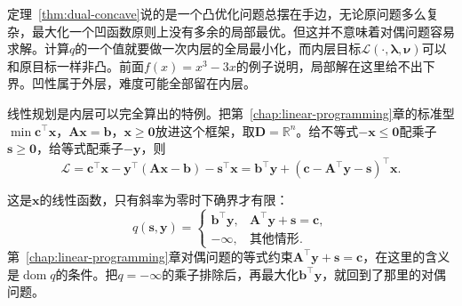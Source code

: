 定理~\ref{thm:dual-concave}说的是一个凸优化问题总摆在手边，无论原问题多么复杂，最大化一个凹函数原则上没有多余的局部最优。但这并不意味着对偶问题容易求解。计算$q$的一个值就要做一次内层的全局最小化，而内层目标$\mathcal{L}(\cdot,\bm{\lambda},\bm{\nu})$可以和原目标一样非凸。前面$f(x)=x^3-3x$的例子说明，局部解在这里给不出下界。凹性属于外层，难度可能全部留在内层。

线性规划是内层可以完全算出的特例。把第~\ref{chap:linear-programming}章的标准型$\min\bm{c}^\top\bm{x}$，$\bm{A}\bm{x}=\bm{b}$，$\bm{x}\geq\bm{0}$放进这个框架，取$\bm{D}=\mathbb{R}^n$。给不等式$-\bm{x}\leq\bm{0}$配乘子$\bm{s}\geq\bm{0}$，给等式配乘子$-\bm{y}$，则
\[
 \mathcal{L}=\bm{c}^\top\bm{x}-\bm{y}^\top(\bm{A}\bm{x}-\bm{b})-\bm{s}^\top\bm{x}=\bm{b}^\top\bm{y}+(\bm{c}-\bm{A}^\top\bm{y}-\bm{s})^\top\bm{x}.
\]

这是$\bm{x}$的线性函数，只有斜率为零时下确界才有限：
\[
 q(\bm{s},\bm{y})=\begin{cases}\bm{b}^\top\bm{y}, & \bm{A}^\top\bm{y}+\bm{s}=\bm{c},\\ -\infty, & \text{其他情形}.\end{cases}
\]
第~\ref{chap:linear-programming}章对偶问题的等式约束$\bm{A}^\top\bm{y}+\bm{s}=\bm{c}$，在这里的含义是$\operatorname{dom}q$的条件。把$q=-\infty$的乘子排除后，再最大化$\bm{b}^\top\bm{y}$，就回到了那里的对偶问题。
